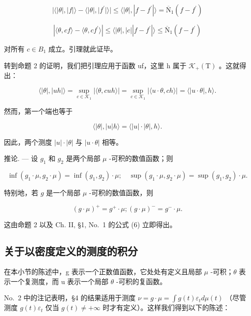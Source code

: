 \[
| \langle | \theta |, | f | \rangle - \langle | \theta |, | f ^ {\prime} | \rangle | \leqslant \langle | \theta |, | f - f ^ {\prime} | \rangle = \overline {{\mathrm{N}}} _ {1} (f - f ^ {\prime})
\]

\[
| \langle \theta , c f \rangle - \langle \theta , c f ^ {\prime} \rangle | \leqslant \langle | \theta |, | c | | f - f ^ {\prime} | \rangle \leqslant \overline {{{\mathrm{N}}}} _ {1} (f - f ^ {\prime})
\]

对所有 \(c \in B_{1}\) 成立。引理就此证毕。

转到命题 2 的证明，我们把引理应用于函数 uf，这里 h 属于 \(\mathcal{K}_{+}(\mathrm{T})\) 。这就得出：

\[
\langle | \theta |, | u h | \rangle = \sup _ {c \in \mathscr {K} _ {1}} | \langle \theta , c u h \rangle | = \sup _ {c \in \mathscr {K} _ {1}} | \langle u \cdot \theta , c h \rangle | = \langle | u \cdot \theta |, h \rangle .
\]

然而，第一个端也等于

\[
\langle | \theta |, | u | h \rangle = \langle | u | \cdot | \theta |, h \rangle .
\]

因此，两个测度 \(|u| \cdot |\theta|\) 与 \(|u \cdot \theta|\) 相等。

推论. --- 设 \(g_{1}\) 和 \(g_{2}\) 是两个局部 \(\mu\) -可积的数值函数；则

\[
\inf (g _ {1} \cdot \mu , g _ {2} \cdot \mu) = \inf (g _ {1}, g _ {2}) \cdot \mu ; \quad \sup (g _ {1} \cdot \mu , g _ {2} \cdot \mu) = \sup (g _ {1}, g _ {2}) \cdot \mu .
\]

特别地，若 \(g\) 是一个局部 \(\mu\) -可积的数值函数，则

\[
(g \cdot \mu) ^ {+} = g ^ {+} \cdot \mu ; (g \cdot \mu) ^ {-} = g ^ {-} \cdot \mu .
\]

这由命题 2 以及 Ch. II, §1, No.~1 的公式 (6) 立即得出。

\subsection{关于以密度定义的测度的积分}

在本小节的陈述中，g 表示一个正数值函数，它处处有定义且局部 \(\mu\) -可积；\(\theta\) 表示一个复测度，而 u 表示一个局部 \(\theta\) -可积的复函数。

No.~2 中的注记表明，§4 的结果适用于测度 \(\nu = g \cdot \mu = \int g(t)\varepsilon_t d\mu(t)\) （尽管测度 \(g(t)\varepsilon_t\) 仅当 \(g(t) \neq +\infty\) 时才有定义）。这样我们得到以下的陈述：

